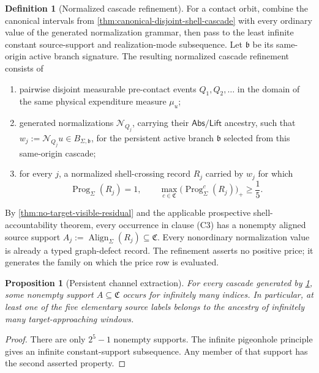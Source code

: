 \documentclass[11pt]{article}
\numberwithin{section}{part}
\theoremstyle{plain}
\newtheorem{proposition}[proposition]{Proposition}
\theoremstyle{definition}
\newtheorem{definition}[definition]{Definition}
\theoremstyle{remark}
\newcommand{\Abs}{\mathsf{Abs}}
\newcommand{\Lift}{\mathsf{Lift}}
\newcommand{\Channels}{\mathfrak C}
\newcommand{\Align}{\operatorname{Align}}
\begin{document}
\begin{definition}[Normalized cascade refinement]
\label{def:contact-cascade-refinement}
For a contact orbit, combine the canonical intervals from
\cref{thm:canonical-disjoint-shell-cascade} with every ordinary value of the
generated normalization grammar, then pass to the least infinite constant
source-support and realization-mode subsequence.  Let \(\mathfrak b\) be its
same-origin active branch signature.  The resulting normalized cascade
refinement consists of
\begin{enumerate}[label=\textup{(C\arabic*)}]
\item pairwise disjoint measurable pre-contact events
  \(Q_1,Q_2,\ldots\) in the domain of the same physical expenditure measure
  \(\mu_u\);
\item generated normalizations \(\mathcal N_{Q_j}\), carrying their
  \(\Abs/\Lift\) ancestry, such that
  \(w_j:=\mathcal N_{Q_j}u\in B_{\Sigma,\mathfrak b}\), for the persistent
  active branch \(\mathfrak b\) selected from this same-origin cascade;
\item for every \(j\), a normalized shell-crossing record \(R_j\) carried by
  \(w_j\) for which
  \begin{equation}
   \label{eq:cascade-unit-shell-accountability}
   \operatorname{Prog}_\Sigma(R_j)=1,
   \qquad
   \max_{c\in\Channels}
      \bigl(\operatorname{Prog}_\Sigma^c(R_j)\bigr)_+\ge\frac15.
  \end{equation}
\end{enumerate}
By \cref{thm:no-target-visible-residual} and the applicable prospective
shell-accountability theorem, every occurrence in clause \textup{(C3)} has a
nonempty aligned source support
\(A_j:=\Align_\Sigma(R_j)\subseteq\Channels\).  Every nonordinary
normalization value is already a typed graph-defect record.  The refinement
asserts no positive price; it generates the family on which the price row is
evaluated.
\end{definition}

\begin{proposition}[Persistent channel extraction]
\label{prop:persistent-channel-extraction}
For every cascade generated by \cref{def:contact-cascade-refinement}, some
nonempty support \(A\subseteq\Channels\) occurs for infinitely many indices.
In particular, at least one of the five elementary source labels belongs to
the ancestry of infinitely many target-approaching windows.
\end{proposition}

\begin{proof}
There are only \(2^5-1\) nonempty supports.  The infinite pigeonhole
principle gives an infinite constant-support subsequence.  Any member of that
support has the second asserted property.
\end{proof}
\end{document}
